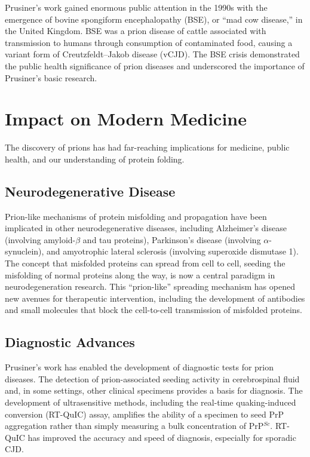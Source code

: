 Prusiner's work gained enormous public attention in the 1990s with the emergence of bovine spongiform encephalopathy (BSE), or ``mad cow disease,'' in the United Kingdom. BSE was a prion disease of cattle associated with transmission to humans through consumption of contaminated food, causing a variant form of Creutzfeldt--Jakob disease (vCJD). The BSE crisis demonstrated the public health significance of prion diseases and underscored the importance of Prusiner's basic research.

\section{Impact on Modern Medicine}

The discovery of prions has had far-reaching implications for medicine, public health, and our understanding of protein folding.

\subsection{Neurodegenerative Disease}

Prion-like mechanisms of protein misfolding and propagation have been implicated in other neurodegenerative diseases, including Alzheimer's disease (involving amyloid-$\beta$ and tau proteins), Parkinson's disease (involving $\alpha$-synuclein), and amyotrophic lateral sclerosis (involving superoxide dismutase 1). The concept that misfolded proteins can spread from cell to cell, seeding the misfolding of normal proteins along the way, is now a central paradigm in neurodegeneration research. This ``prion-like'' spreading mechanism has opened new avenues for therapeutic intervention, including the development of antibodies and small molecules that block the cell-to-cell transmission of misfolded proteins.

\subsection{Diagnostic Advances}

Prusiner's work has enabled the development of diagnostic tests for prion diseases. The detection of prion-associated seeding activity in cerebrospinal fluid and, in some settings, other clinical specimens provides a basis for diagnosis. The development of ultrasensitive methods, including the real-time quaking-induced conversion (RT-QuIC) assay, amplifies the ability of a specimen to seed PrP aggregation rather than simply measuring a bulk concentration of PrP$^{Sc}$. RT-QuIC has improved the accuracy and speed of diagnosis, especially for sporadic CJD.

